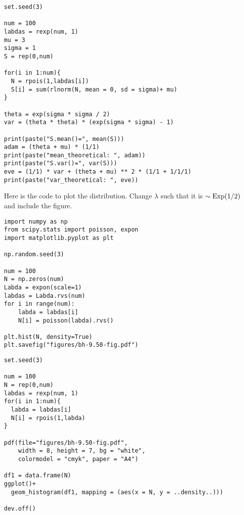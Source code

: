 \begin{verbatim}
set.seed(3)

num = 100
labdas = rexp(num, 1) 
mu = 3
sigma = 1
S = rep(0,num)

for(i in 1:num){
  N = rpois(1,labdas[i])
  S[i] = sum(rlnorm(N, mean = 0, sd = sigma)+ mu)
}

theta = exp(sigma * sigma / 2) 
var = (theta * theta) * (exp(sigma * sigma) - 1)

print(paste("S.mean()=", mean(S)))
adam = (theta + mu) * (1/1)
print(paste("mean_theoretical: ", adam))
print(paste("S.var()=", var(S)))
eve = (1/1) * var + (theta + mu) ** 2 * (1/1 + 1/1/1)
print(paste("var_theoretical: ", eve))
\end{verbatim}

\begin{exercise}
Here is the code to plot the distribution. Change $\lambda$ such that it is $\sim\mathrm{Exp}(1/2)$ and include the figure.
\begin{verbatim}
import numpy as np
from scipy.stats import poisson, expon
import matplotlib.pyplot as plt

np.random.seed(3)

num = 100
N = np.zeros(num)
Labda = expon(scale=1)
labdas = Labda.rvs(num)
for i in range(num):
    labda = labdas[i]
    N[i] = poisson(labda).rvs()

plt.hist(N, density=True)
plt.savefig("figures/bh-9.50-fig.pdf")
\end{verbatim}
\end{exercise}

\begin{verbatim}
set.seed(3)

num = 100
N = rep(0,num)
labdas = rexp(num, 1)
for(i in 1:num){
  labda = labdas[i]
  N[i] = rpois(1,labda)
}

pdf(file="figures/bh-9.50-fig.pdf",
    width = 8, height = 7, bg = "white",          
    colormodel = "cmyk", paper = "A4")

df1 = data.frame(N)
ggplot()+
  geom_histogram(df1, mapping = (aes(x = N, y = ..density..)))

dev.off()
\end{verbatim}

